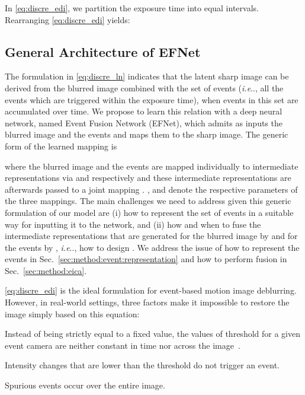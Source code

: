 \documentclass[runningheads]{llncs}
\makeatletter
\DeclareRobustCommand\onedot{\futurelet\@let@token\@onedot}
\def\@onedot{\ifx\@let@token.\else.\null\fi\xspace}
\def\ie{\emph{i.e}\onedot} \def\Ie{\emph{I.e}\onedot}
\newlength \g
\makeatother
\begin{document}
In \eqref{eq:discre_edi}, we partition the exposure time  into  equal intervals. Rearranging \eqref{eq:discre_edi} yields:
{\small

}

\subsection{General Architecture of EFNet}
\label{sec:method:general}

The formulation in \eqref{eq:discre_ln} indicates that the latent sharp image can be derived from the blurred image combined with the set of events  (\ie, all the events which are triggered within the exposure time), when events in this set are accumulated over time. We propose to learn this relation with a deep neural network, named Event Fusion Network (EFNet), which admits as inputs the blurred image and the events and maps them to the sharp image. The generic form of the learned mapping is

where the blurred image and the events are mapped individually to intermediate representations via  and  respectively and these intermediate representations are afterwards passed to a joint mapping . ,  and  denote the respective parameters of the three mappings. The main challenges we need to address given this generic formulation of our model are (i) how to represent the set of events  in a suitable way for inputting it to the network, and (ii) how and when to fuse the intermediate representations that are generated for the blurred image by  and for the events by , \ie, how to design . We address the issue of how to represent the events in Sec.~\ref{sec:method:event:representation} and how to perform fusion in Sec.~\ref{sec:method:eica}.

\eqref{eq:discre_edi} is the ideal formulation for event-based motion image deblurring. However, in real-world settings, three factors make it impossible to restore the image simply based on this equation:


\begin{compactitem}
    \item{Instead of being strictly equal to a fixed value, the values of threshold  for a given event camera are neither constant in time nor across the image~\cite{stoffregen2020reducing,wang19acra}}.
    \item{Intensity changes that are lower than the threshold  do not trigger an event.}
    \item{Spurious events occur over the entire image.}
\end{compactitem}
\end{document}
